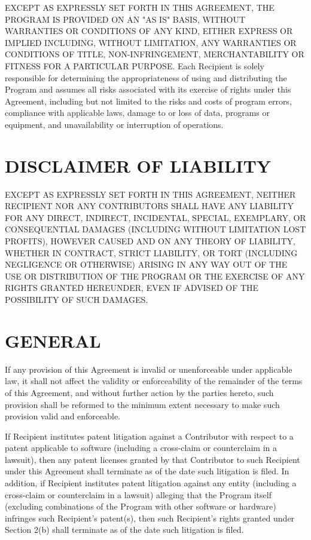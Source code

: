 EXCEPT AS EXPRESSLY SET FORTH IN THIS AGREEMENT, THE PROGRAM IS PROVIDED ON AN  "AS IS" BASIS, WITHOUT WARRANTIES OR CONDITIONS OF ANY KIND, EITHER EXPRESS OR  IMPLIED INCLUDING, WITHOUT LIMITATION, ANY WARRANTIES OR CONDITIONS OF TITLE,  NON-INFRINGEMENT, MERCHANTABILITY OR FITNESS FOR A PARTICULAR PURPOSE. Each  Recipient is solely responsible for determining the appropriateness of using  and distributing the Program and assumes all risks associated with its exercise  of rights under this Agreement, including but not limited to the risks and  costs of program errors, compliance with applicable laws, damage to or loss of  data, programs or equipment, and unavailability or interruption of operations.


\section{DISCLAIMER OF LIABILITY}

EXCEPT AS EXPRESSLY SET FORTH IN THIS AGREEMENT, NEITHER RECIPIENT NOR ANY  CONTRIBUTORS SHALL HAVE ANY LIABILITY FOR ANY DIRECT, INDIRECT, INCIDENTAL,  SPECIAL, EXEMPLARY, OR CONSEQUENTIAL DAMAGES (INCLUDING WITHOUT LIMITATION LOST  PROFITS), HOWEVER CAUSED AND ON ANY THEORY OF LIABILITY, WHETHER IN CONTRACT,  STRICT LIABILITY, OR TORT (INCLUDING NEGLIGENCE OR OTHERWISE) ARISING IN ANY  WAY OUT OF THE USE OR DISTRIBUTION OF THE PROGRAM OR THE EXERCISE OF ANY RIGHTS  GRANTED HEREUNDER, EVEN IF ADVISED OF THE POSSIBILITY OF SUCH DAMAGES.

\section{GENERAL}

If any provision of this Agreement is invalid or unenforceable under applicable law, it shall not affect the validity or enforceability of the remainder of the terms of this Agreement, and without further action by the  parties hereto, such provision shall be reformed to the minimum extent  necessary to make such provision valid and enforceable.


If Recipient institutes patent litigation against a Contributor with respect  to a patent applicable to software (including a cross-claim or counterclaim in  a lawsuit), then any patent licenses granted by that Contributor to such  Recipient under this Agreement shall terminate as of the date such litigation  is filed. In addition, if Recipient institutes patent litigation against any  entity (including a cross-claim or counterclaim in a lawsuit) alleging that the  Program itself (excluding combinations of the Program with other software or  hardware) infringes such Recipient's patent(s), then such Recipient's rights  granted under Section 2(b) shall terminate as of the date such litigation is  filed.


